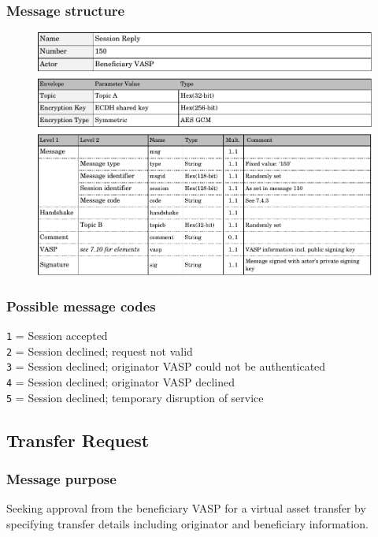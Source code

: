 \documentclass{article}
\begin{document}
\subsubsection{Message structure}
\begin{figure}[h]
    \centering
    \includegraphics[width=\textwidth]{g21.pdf}
\end{figure}
\subsubsection{Possible message codes}
\verb+1+ = Session accepted\\
\verb+2+ = Session declined; request not valid\\
\verb+3+ = Session declined; originator VASP could not be authenticated\\
\verb+4+ = Session declined; originator VASP declined\\
\verb+5+ = Session declined; temporary disruption of service\\
\newpage

\subsection{Transfer Request}
\subsubsection{Message purpose}
Seeking approval from the beneficiary VASP for a virtual asset transfer by specifying transfer details including originator and beneficiary information.
\end{document}
